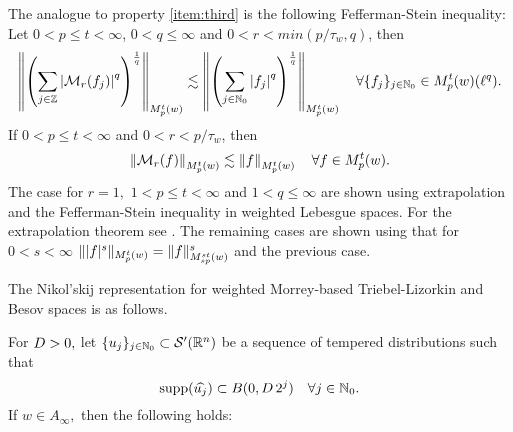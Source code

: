 The analogue to property \ref{item:third} is the following Fefferman-Stein inequality:
Let $0<p\leq t<\infty$, $0<q\leq\infty$ and $0<r<min(p/\tau_w,q)$, then
\begin{equation}\label{eq:FTMorrey}
\left\|\left(\sum_{j\in\mathbb{Z}} \left\vert \mathcal{M}_r(f_j) \right\vert^q\right)^{\frac{1}{q}}\right\|_{M_{p}^{t}(w)}\lesssim \left\|\left(\sum_{j\in\mathbb{N}_0} \left\vert f_j \right\vert^q\right)^{\frac{1}{q}}\right\|_{M_{p}^{t}(w)}\quad \forall \{f_j\}_{j\in \mathbb{N}_0}\in M_{p}^{t}(w)(\ell^q).
\end{equation}
If $0<p\leq t <\infty$ and $0<r<p/\tau_w$, then 
\begin{equation*}
\left\|\mathcal{M}_r(f)\right\|_{M_{p}^{t}(w)}\lesssim \left\|f\right\|_{M_{p}^{t}(w)}\quad \forall f\in M_{p}^{t}(w). 
\end{equation*}
The case for $r=1,$ $1<p\le t<\infty$ and $1<q\le \infty$ are shown using extrapolation and the Fefferman-Stein inequality in weighted Lebesgue spaces. For the extrapolation theorem see \cite[Theorem 5.3]{MR3538648}. The remaining cases are shown using that for $0<s<\infty$ $\| |f|^s \|_{M_{p}^{t}(w)} = \|f\|^s_{M_{sp}^{st}(w)}$ and the previous case.

The Nikol'skij representation for weighted Morrey-based Triebel-Lizorkin and Besov spaces is as follows.
\begin{theorem}\label{thm:Nikolskij:weighted} For $D> 0,$ let $\{u_j\}_{j \in \mathbb{N}_0} \subset \mathcal{S}'({{\mathbb R}^n})$ be a sequence of tempered distributions such that
\begin{equation*}
{\rm{supp}}(\widehat{u_j}) \subset B(0, D\, 2^j ) \quad \forall j \in \mathbb{N}_0.
\end{equation*}
If $w\in A_\infty,$ then the following holds:  
\end{theorem}

